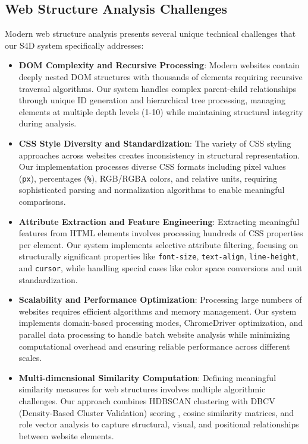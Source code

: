 \subsection{Web Structure Analysis Challenges}
\label{subsec:web-challenges}

Modern web structure analysis presents several unique technical challenges that our S4D system specifically addresses:

\begin{itemize}
    \item \textbf{DOM Complexity and Recursive Processing}: Modern websites contain deeply nested DOM structures with thousands of elements requiring recursive traversal algorithms. Our system handles complex parent-child relationships through unique ID generation and hierarchical tree processing, managing elements at multiple depth levels (1-10) while maintaining structural integrity during analysis.
    
    \item \textbf{CSS Style Diversity and Standardization}: The variety of CSS styling approaches across websites creates inconsistency in structural representation. Our implementation processes diverse CSS formats including pixel values (\texttt{px}), percentages (\texttt{\%}), RGB/RGBA colors, and relative units, requiring sophisticated parsing and normalization algorithms to enable meaningful comparisons.
    
    \item \textbf{Attribute Extraction and Feature Engineering}: Extracting meaningful features from HTML elements involves processing hundreds of CSS properties per element. Our system implements selective attribute filtering, focusing on structurally significant properties like \texttt{font-size}, \texttt{text-align}, \texttt{line-height}, and \texttt{cursor}, while handling special cases like color space conversions and unit standardization.
    
    \item \textbf{Scalability and Performance Optimization}: Processing large numbers of websites requires efficient algorithms and memory management. Our system implements domain-based processing modes, ChromeDriver optimization, and parallel data processing to handle batch website analysis while minimizing computational overhead and ensuring reliable performance across different scales.
    
    \item \textbf{Multi-dimensional Similarity Computation}: Defining meaningful similarity measures for web structures involves multiple algorithmic challenges. Our approach combines HDBSCAN clustering with DBCV (Density-Based Cluster Validation) scoring \cite{moulavi2014dbcv}, cosine similarity matrices, and role vector analysis to capture structural, visual, and positional relationships between website elements.
    

\end{itemize}
